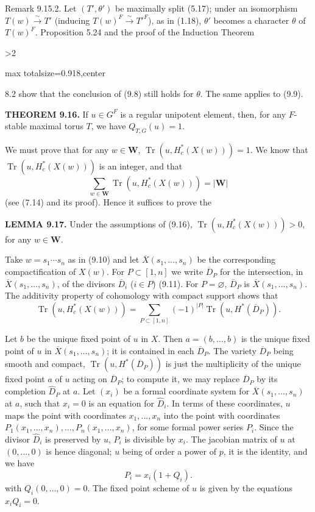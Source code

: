 \documentclass[9pt,twoside]{extarticle}
\newcommand{\EditionPage}[3]{%
  \ifnum#1>2\clearpage\fi
  \pdfbookmark[1]{Printed page #2}{en-folio-#2}%
  \hypertarget{en-physical-#1}{}%
  \noindent\begin{adjustbox}{max totalsize={\textwidth}{0.918\textheight},center}
  \begin{minipage}[t]{\textwidth}
  \fontsize{9.4}{11.1}\selectfont\justifying
  #3
  \end{minipage}
  \end{adjustbox}%
}
\begin{document}
{Remark 9.15.2. Let \((T',\theta')\) be maximally split (5.17); under an isomorphism \(T(w)\xrightarrow{\sim}T'\) (inducing \(T(w)^F\xrightarrow{\sim}T'^{F}\)), as in (1.18), \(\theta'\) becomes a character \(\theta\) of \(T(w)^F\). Proposition 5.24 and the proof of the Induction Theorem\par
}

\EditionPage{52}{153}{%
8.2 show that the conclusion of (9.8) still holds for \(\theta\). The same applies to (9.9).\par

\noindent\textbf{THEOREM 9.16.} If \(u\in G^F\) is a regular unipotent element, then, for any \(F\)-stable maximal torus \(T\), we have \(Q_{T,G}(u)=1\).\par

We must prove that for any \(w\in\mathbf W\), \(\operatorname{Tr}(u,H_c^*(X(w)))=1\). We know that \(\operatorname{Tr}(u,H_c^*(X(w)))\) is an integer, and that \[
\sum_{w\in\mathbf W}\operatorname{Tr}(u,H_c^*(X(w)))=|\mathbf W|
\] (see (7.14) and its proof). Hence it suffices to prove the\par

\noindent\textbf{LEMMA 9.17.} Under the assumptions of (9.16), \(\operatorname{Tr}(u,H_c^*(X(w)))>0\), for any \(w\in\mathbf W\).\par

Take \(w=s_1\cdots s_n\) as in (9.10) and let \(\overline X(s_1,\ldots,s_n)\) be the corresponding compactification of \(X(w)\). For \(P\subset[1,n]\) we write \(\overline D_P\) for the intersection, in \(\overline X(s_1,\ldots,s_n)\), of the divisors \(\overline D_i\) (\(i\in P\)) (9.11). For \(P=\varnothing\), \(\overline D_P\) is \(\overline X(s_1,\ldots,s_n)\). The additivity property of cohomology with compact support shows that \[
\tag{9.17.1}
\operatorname{Tr}(u,H_c^*(X(w)))
=
\sum_{P\subset[1,n]}(-1)^{|P|}\operatorname{Tr}(u,H^*(\overline D_P)).
\]\par

Let \(b\) be the unique fixed point of \(u\) in \(X\). Then \(a=(b,\ldots,b)\) is the unique fixed point of \(u\) in \(\overline X(s_1,\ldots,s_n)\); it is contained in each \(\overline D_P\). The variety \(\overline D_P\) being smooth and compact, \(\operatorname{Tr}(u,H^*(\overline D_P))\) is just the multiplicity of the unique fixed point \(a\) of \(u\) acting on \(\overline D_P\); to compute it, we may replace \(\overline D_P\) by its completion \(\widehat D_P\) at \(a\). Let \((x_i)\) be a formal coordinate system for \(\overline X(s_1,\ldots,s_n)\) at \(a\), such that \(x_i=0\) is an equation for \(\widehat D_i\). In terms of these coordinates, \(u\) maps the point with coordinates \(x_1,\ldots,x_n\) into the point with coordinates \(P_1(x_1,\ldots,x_n),\ldots,P_n(x_1,\ldots,x_n)\), for some formal power series \(P_i\). Since the divisor \(\widehat D_i\) is preserved by \(u\), \(P_i\) is divisible by \(x_i\). The jacobian matrix of \(u\) at \((0,\ldots,0)\) is hence diagonal; \(u\) being of order a power of \(p\), it is the identity, and we have \[
P_i=x_i(1+Q_i).
\] with \(Q_i(0,\ldots,0)=0\). The fixed point scheme of \(u\) is given by the equations \(x_iQ_i=0\).\par

}
\end{document}
